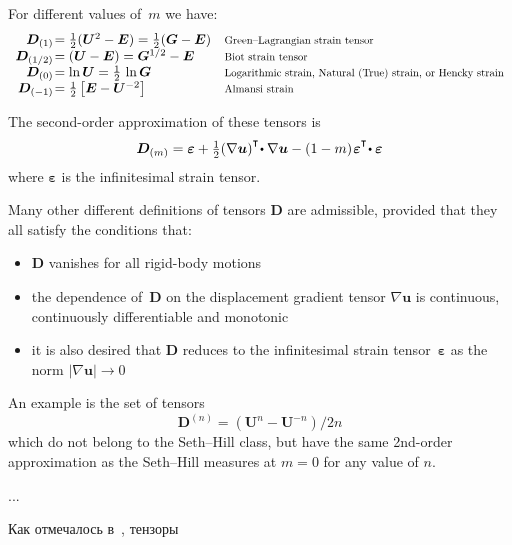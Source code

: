 \begin{otherlanguage}{russian}
{For different values of~$m$ we have:
\[ \textstyle \begin{array}{r@{\hspace{0.1em}}ll}
\bm{D}_{(1)} & = \onehalf (\bm{U}^{2} - \bm{E}) = \onehalf (\bm{G} - \bm{E}) & \text{\scalebox{0.8}{Green\hbox{--}Lagrangian strain tensor}} \\
\bm{D}_{(1/2)} & = (\bm{U} - \bm{E}) = \bm{G}^{1/2} - \bm{E} & \text{\scalebox{0.8}{Biot strain tensor}} \\
\bm{D}_{(0)} & = \ln \bm{U} = \onehalf\, \ln \bm{G} & \text{\scalebox{0.8}{Logarithmic strain, Natural~(True) strain, or Hencky strain}} \\
\bm{D}_{(-1)} & = \onehalf \left[ \bm{E} - \bm{U}^{-2} \right] & \text{\scalebox{0.8}{Almansi strain}}
\end{array} \]

The second\hbox{-}order approximation of these tensors is
\[ \displaystyle \bm{D}_{(m)} = \bm{\varepsilon} + \tfrac{1}{2} (\nabla \bm{u} )^{\T}\! \dotp \nabla \bm{u} - (1 - m) \hspace{0.2ex} {\bm{\varepsilon}}^{\T}\! \dotp \bm{\varepsilon} \]
where $\bm{\varepsilon}$ is the infinitesimal strain tensor.

Many other different definitions of tensors $\bm{D}$ are admissible, provided that they all satisfy the conditions that:

\begin{itemize}
\item $\bm{D}$ vanishes for all rigid\hbox{-}body motions
\item the dependence of~$\bm{D}$ on the displacement gradient tensor ${\nabla \bm{u}}$ is continuous, continuously differentiable and monotonic
\item it is also desired that $\bm{D}$ reduces to the infinitesimal strain tensor~$\bm{\varepsilon}$ as the norm ${| \nabla\bm{u}| \to 0}$
\end{itemize}

An example is the set of tensors
\[ \displaystyle \bm{D}^{(n)} = \left( {\bm{U}}^{n} - {\bm{U}}^{-n} \right) / 2n \]
which do not belong to the Seth\hbox{--}Hill class, but have the same 2nd\hbox{-}order approximation as the Seth\hbox{--}Hill measures at ${m=0}$ for any value of $n$.

\par}

\vspace{1cm}


...

Как отмечалось в~, тензоры



\end{otherlanguage}
